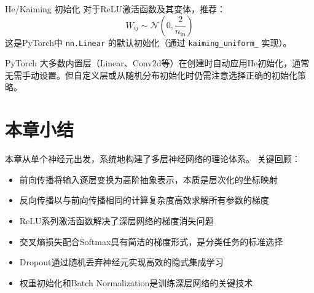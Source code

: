 \begin{myTheorem}{He/Kaiming 初始化}
对于ReLU激活函数及其变体，推荐：
\[
W_{ij} \sim \mathcal{N}\!\left(0, \frac{2}{n_{\text{in}}}\right)
\]
这是PyTorch中 \texttt{nn.Linear} 的默认初始化（通过 \texttt{kaiming\_uniform\_} 实现）。
\end{myTheorem}

\begin{remark}
PyTorch 大多数内置层（Linear、Conv2d等）在创建时自动应用He初始化，通常无需手动设置。但自定义层或从随机分布初始化时仍需注意选择正确的初始化策略。
\end{remark}

\section{本章小结}

本章从单个神经元出发，系统地构建了多层神经网络的理论体系。
关键回顾：
\begin{itemize}
    \item 前向传播将输入逐层变换为高阶抽象表示，本质是层次化的坐标映射
    \item 反向传播以与前向传播相同的计算复杂度高效求解所有参数的梯度
    \item ReLU系列激活函数解决了深层网络的梯度消失问题
    \item 交叉熵损失配合Softmax具有简洁的梯度形式，是分类任务的标准选择
    \item Dropout通过随机丢弃神经元实现高效的隐式集成学习
    \item 权重初始化和Batch Normalization是训练深层网络的关键技术
\end{itemize}

